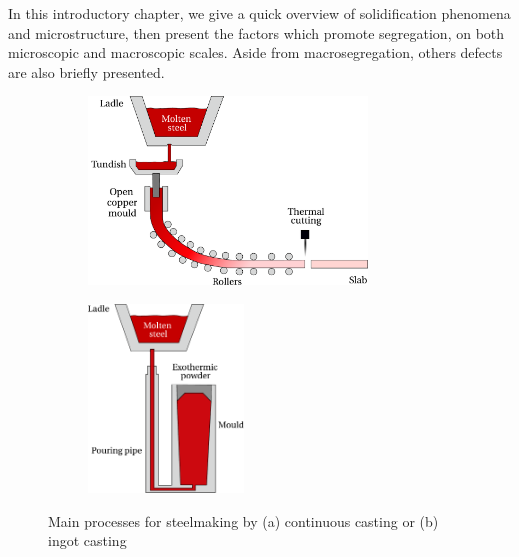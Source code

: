 In this introductory chapter, we give a quick overview of solidification phenomena and microstructure, then present the factors which
promote segregation, on both microscopic and macroscopic scales. Aside from macrosegregation, others defects are also briefly presented.
\begin{figure}[htbp]
\centering
  \begin{subfigure}[t]{0.6\textwidth}
    \centering
	\includegraphics[height=5cm]{Chapter0/Graphics/fig_continuous_casting.pdf}
	\caption{}
    \label{fig:continuous_casting}
  \end{subfigure}
   \begin{subfigure}[t]{0.3\textwidth}
    \centering
	\includegraphics[height=5cm]{Chapter0/Graphics/fig_ingot_casting.pdf}
	\caption{}
    \label{fig:ingot_casting}
  \end{subfigure}
\caption{Main processes for steelmaking by (a) continuous casting or (b) ingot casting} 
\label{fig:casting}
\end{figure}
%
%


